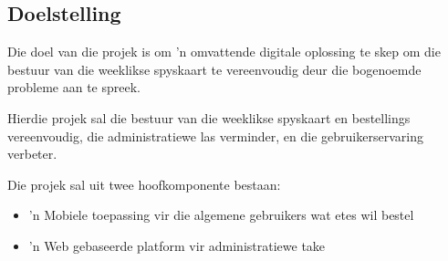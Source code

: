 \subsection{Doelstelling}
Die doel van die projek is om 'n omvattende digitale oplossing te
skep om die bestuur van die weeklikse spyskaart te vereenvoudig deur
die bogenoemde probleme aan te spreek.

Hierdie projek sal die bestuur van die weeklikse spyskaart en
bestellings vereenvoudig, die administratiewe las verminder, en die
gebruikerservaring verbeter.

Die projek sal uit twee hoofkomponente bestaan:
\begin{itemize}
  \item 'n Mobiele toepassing vir die algemene gebruikers wat etes wil bestel
  \item 'n Web gebaseerde platform vir administratiewe take
\end{itemize}
